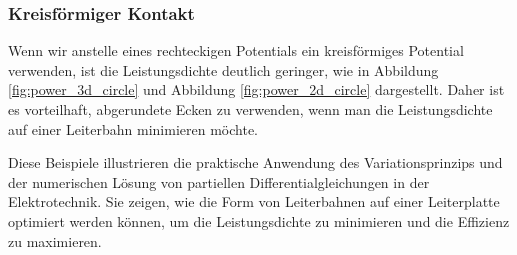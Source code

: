 \subsubsection{Kreisförmiger Kontakt} Wenn wir anstelle eines rechteckigen Potentials ein kreisförmiges Potential verwenden, ist die Leistungsdichte deutlich geringer, wie in Abbildung \ref{fig:power_3d_circle} und Abbildung \ref{fig:power_2d_circle} dargestellt. Daher ist es vorteilhaft, abgerundete Ecken zu verwenden, wenn man die Leistungsdichte auf einer Leiterbahn minimieren möchte.

Diese Beispiele illustrieren die praktische Anwendung des Variationsprinzips und der numerischen Lösung von partiellen Differentialgleichungen in der Elektrotechnik. Sie zeigen, wie die Form von Leiterbahnen auf einer Leiterplatte optimiert werden können, um die Leistungsdichte zu minimieren und die Effizienz zu maximieren.